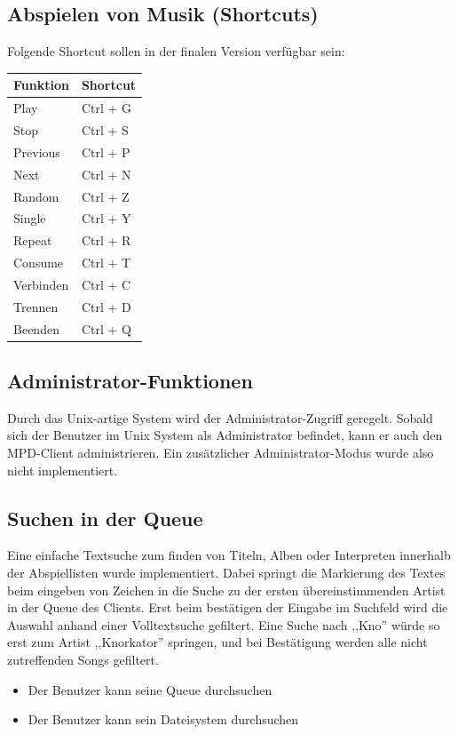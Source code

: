 \subsection{Abspielen von Musik (Shortcuts)}
Folgende Shortcut sollen in der finalen Version verfügbar sein:\\
\begin{tabularx}{\textwidth}{|X|X|}
    \hline
    \textbf{Funktion} & \textbf{Shortcut} \\
    \hline
     Play & Ctrl + G \\ 
    \hline
     Stop & Ctrl + S \\ 
    \hline
     Previous & Ctrl + P \\
    \hline
     Next & Ctrl + N \\
    \hline
     Random & Ctrl + Z \\
    \hline
     Single & Ctrl + Y \\ 
    \hline
     Repeat & Ctrl + R \\
    \hline
     Consume & Ctrl + T \\
    \hline 
     Verbinden & Ctrl + C \\
    \hline
     Trennen & Ctrl + D \\
    \hline
     Beenden & Ctrl + Q \\
    \hline
\end{tabularx}


\subsection{Administrator-Funktionen}
Durch das Unix-artige System wird der Administrator-Zugriff geregelt. Sobald sich der Benutzer im Unix System
als Administrator befindet, kann er auch den MPD-Client administrieren. Ein zusätzlicher Administrator-Modus wurde also
nicht implementiert.

\subsection{Suchen in der Queue}
Eine einfache Textsuche zum finden von Titeln, Alben oder Interpreten innerhalb der 
Abspiellisten wurde implementiert. Dabei springt die Markierung des Textes beim 
eingeben von Zeichen in die Suche zu der ersten übereinstimmenden Artist in der 
Queue des Clients. Erst beim bestätigen der Eingabe im Suchfeld wird die Auswahl 
anhand einer Volltextsuche gefiltert. Eine Suche nach ,,Kno'' würde so erst zum Artist ,,Knorkator''
springen, und bei Bestätigung werden alle nicht zutreffenden Songs gefiltert.
\begin{itemize}
    \item Der Benutzer kann seine Queue durchsuchen
    \item Der Benutzer kann sein Dateisystem durchsuchen
\end{itemize}
